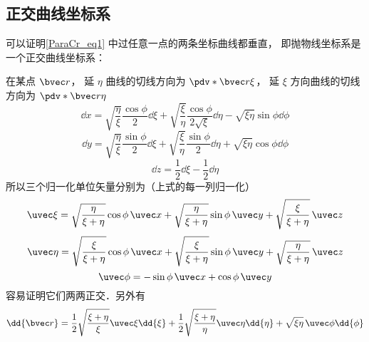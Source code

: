 \subsection{正交曲线坐标系}
可以证明\autoref{ParaCr_eq1} 中过任意一点的两条坐标曲线都垂直， 即抛物线坐标系是一个正交曲线坐标系：

在某点 $\bvec r$， 延 $\eta$ 曲线的切线方向为 $\pdv*{\bvec r}{\xi}$， 延 $\xi$ 方向曲线的切线方向为 $\pdv*{\bvec r}{\eta}$
\begin{equation}
\dd{x} = \sqrt{\frac{\eta}{\xi}}\frac{\cos\phi}{2}\dd{\xi} + \sqrt{\frac{\xi}{\eta}}\frac{\cos\phi}{2\sqrt{\xi}}\dd{\eta} - \sqrt{\xi\eta}\sin\phi\dd{\phi}
\end{equation}
\begin{equation}
\dd{y} = \sqrt{\frac{\eta}{\xi}}\frac{\sin\phi}{2}\dd{\xi} + \sqrt{\frac{\xi}{\eta}}\frac{\sin\phi}{2}\dd{\eta} + \sqrt{\xi\eta}\cos\phi\dd{\phi}
\end{equation}
\begin{equation}
\dd{z} = \frac{1}{2}\dd{\xi} - \frac{1}{2}\dd{\eta}
\end{equation}
所以三个归一化单位矢量分别为（上式的每一列归一化）
\begin{equation}
\uvec \xi = \sqrt{\frac{\eta}{\xi+\eta}}\cos\phi\,\uvec x + \sqrt{\frac{\eta}{\xi+\eta}}\sin\phi\,\uvec y + \sqrt{\frac{\xi}{\xi+\eta}}\,\uvec z
\end{equation}
\begin{equation}
\uvec \eta = \sqrt{\frac{\xi}{\xi+\eta}}\cos\phi\,\uvec x + \sqrt{\frac{\xi}{\xi+\eta}}\sin\phi\,\uvec y + \sqrt{\frac{\eta}{\xi+\eta}}\,\uvec z
\end{equation}
\begin{equation}
\uvec \phi = -\sin\phi \,\uvec x + \cos\phi \,\uvec y
\end{equation}
容易证明它们两两正交．另外有
\begin{equation}\label{ParaCr_eq4}
\dd{\bvec r} = \frac{1}{2}\sqrt{\frac{\xi + \eta}{\xi}} \uvec \xi \dd{\xi}
+ \frac{1}{2}\sqrt{\frac{\xi + \eta}{\eta}} \uvec \eta \dd{\eta}
+ \sqrt{\xi\eta}\, \uvec \phi \dd{\phi}
\end{equation}

